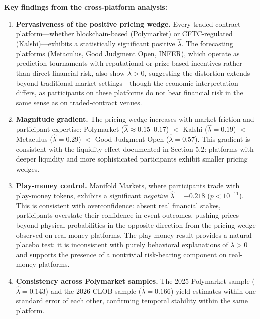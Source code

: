 \documentclass[12pt,a4paper]{article}
\begin{document}
\textbf{Key findings from the cross-platform analysis:}

\begin{enumerate}
\def\labelenumi{\arabic{enumi}.}
\item
  \textbf{Pervasiveness of the positive pricing wedge.} Every
  traded-contract platform---whether blockchain-based (Polymarket) or
  CFTC-regulated (Kalshi)---exhibits a statistically significant
  positive \(\hat{\lambda}\). The forecasting platforms (Metaculus, Good
  Judgment Open, INFER), which operate as prediction tournaments with
  reputational or prize-based incentives rather than direct financial
  risk, also show \(\hat{\lambda} > 0\), suggesting the distortion
  extends beyond traditional market settings---though the economic
  interpretation differs, as participants on these platforms do not bear
  financial risk in the same sense as on traded-contract venues.
\item
  \textbf{Magnitude gradient.} The pricing wedge increases with market
  friction and participant expertise: Polymarket
  (\(\hat{\lambda} \approx 0.15\)--\(0.17\)) \(<\) Kalshi
  (\(\hat{\lambda} = 0.19\)) \(<\) Metaculus (\(\hat{\lambda} = 0.29\))
  \(<\) Good Judgment Open (\(\hat{\lambda} = 0.57\)). This gradient is
  consistent with the liquidity effect documented in Section 5.2:
  platforms with deeper liquidity and more sophisticated participants
  exhibit smaller pricing wedges.
\item
  \textbf{Play-money control.} Manifold Markets, where participants
  trade with play-money tokens, exhibits a significant \textit{negative}
  \(\hat{\lambda} = -0.218\) (\(p < 10^{-11}\)). This is consistent with
  overconfidence: absent real financial stakes, participants overstate
  their confidence in event outcomes, pushing prices beyond physical
  probabilities in the opposite direction from the pricing wedge
  observed on real-money platforms. The play-money result provides a
  natural placebo test: it is inconsistent with purely behavioral
  explanations of \(\lambda > 0\) and supports the presence of a
  nontrivial risk-bearing component on real-money platforms.
\item
  \textbf{Consistency across Polymarket samples.} The 2025 Polymarket
  sample (\(\hat{\lambda} = 0.143\)) and the 2026 CLOB sample
  (\(\hat{\lambda} = 0.166\)) yield estimates within one standard error
  of each other, confirming temporal stability within the same platform.
\end{enumerate}
\end{document}
